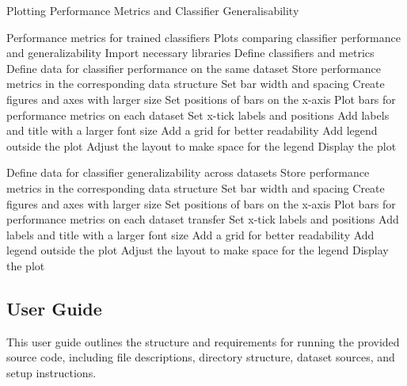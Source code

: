 \begin{algorithm}[ht]
    \caption{Plotting Performance Metrics and Classifier Generalisability}\label{alg:plotData}
    \begin{algorithmic}[1]
    \Require%
    Performance metrics for trained classifiers
    \Ensure%
    Plots comparing classifier performance and generalizability
    \State%
    Import necessary libraries
    \State%
    Define classifiers and metrics
    \State%
    Define data for classifier performance on the same dataset
    \State%
    Store performance metrics in the corresponding data structure
    \EndFor%
    \State%
    Set bar width and spacing
    \State%
    Create figures and axes with larger size
    \State%
    Set positions of bars on the x-axis
    \State%
    Plot bars for performance metrics on each dataset
    \EndFor%
    \State%
    Set x-tick labels and positions
    \State%
    Add labels and title with a larger font size
    \State%
    Add a grid for better readability
    \State%
    Add legend outside the plot
    \State%
    Adjust the layout to make space for the legend
    \State%
    Display the plot
    
    \State%
    Define data for classifier generalizability across datasets
    \State%
    Store performance metrics in the corresponding data structure
    \EndFor%
    \State%
    Set bar width and spacing
    \State%
    Create figures and axes with larger size
    \State%
    Set positions of bars on the x-axis
    \State%
    Plot bars for performance metrics on each dataset transfer
    \EndFor%
    \State%
    Set x-tick labels and positions
    \State%
    Add labels and title with a larger font size
    \State%
    Add a grid for better readability
    \State%
    Add legend outside the plot
    \State%
    Adjust the layout to make space for the legend
    \State%
    Display the plot
    \end{algorithmic}
    \end{algorithm}

\subsection{User Guide}\label{subsec:user-guide}

This user guide outlines the structure and requirements for running the provided source code, including file descriptions, directory structure, dataset sources, and setup instructions.

